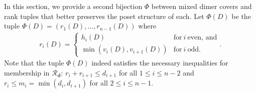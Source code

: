 \documentclass[10pt,a4paper]{amsart}
\def\bfd{{\mathbf{d}}}
\begin{document}
In this section, we provide a second bijection $\Phi$ between mixed dimer covers and rank tuples that better preserves the poset structure of each.  Let $\Phi(D)$ be the tuple $\Phi(D)=(r_1(D),\ldots,r_{n-1}(D))$ where \begin{align}
    r_i(D)=\begin{cases}
        h_i(D) & \text{for}~i~\text{even, and}\\
        \min(v_i(D),v_{i+1}(D)) & \text{for}~i~\text{odd.}
    \end{cases}.\label{eq:def_of_Phi}
\end{align}
Note that the tuple $\Phi(D)$ indeed satisfies the necessary inequalities for membership in $\mathcal{R}_\bfd$: $r_{i}+r_{i+1}\leq d_{i+1}$ for all $1\leq i\leq n-2$ and $r_i\leq m_i = \min(d_{i},d_{i+1})$ for all $2\leq i\leq n-1$.  
\end{document}
